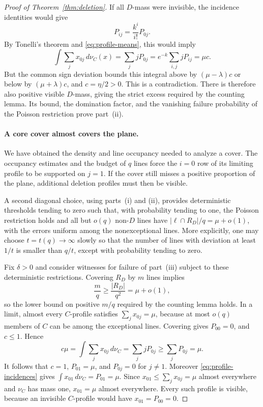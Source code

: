 \begin{proof}[Proof of Theorem~\ref{thm:deletion}]
If all $D$-mass were invisible, the incidence identities would give
\begin{equation}\label{eq:poisson-factorization}
 P_{ij}=\frac{k^i}{i!}P_{0j}.
\end{equation}
By Tonelli's theorem and \eqref{eq:profile-means}, this would imply
\[
 \int\sum_jx_{0j}\,d\nu_C(x)
 =\sum_jjP_{0j}
 =e^{-k}\sum_{i,j}jP_{ij}=\mu c.
\]
But the common sign deviation bounds this integral above by
$(\mu-\lambda)c$ or below by $(\mu+\lambda)c$, and
$c=\eta/2>0$.  This is a contradiction.  There is therefore also positive
visible $D$-mass, giving the strict excess required by the counting
lemma.  Its bound, the domination factor, and the vanishing failure
probability of the Poisson restriction prove part~\textup{(ii)}.

\paragraph{A core cover almost covers the plane.}
We have obtained the density and line occupancy needed to analyze a
cover. The occupancy estimates and the budget of $q$ lines force the
$i=0$ row of its limiting profile to be supported on $j=1$. If the cover
still misses a positive proportion of the plane, additional deletion
profiles must then be visible.

A second diagonal choice, using parts~\textup{(i)} and \textup{(ii)},
provides deterministic thresholds tending to zero such that, with
probability tending to one, the Poisson restriction holds and all but
$o(q)$ non-$D$ lines have $|\ell\cap R_D|/q=\mu+o(1)$, with the errors
uniform among the nonexceptional lines.  More explicitly, one may choose
$t=t(q)\to\infty$ slowly so that the number of lines with deviation at
least $1/t$ is smaller than $q/t$, except with probability tending to zero.

Fix $\delta>0$ and consider witnesses for failure of part~\textup{(iii)}
subject to these deterministic restrictions.  Covering $R_D$ by $m$ lines
implies
\[
 \frac mq\ge\frac{|R_D|}{q^2}=\mu+o(1),
\]
so the lower bound on positive $m/q$ required by the counting lemma holds.
In a limit, almost every $C$-profile satisfies
$\sum_jx_{0j}=\mu$, because at most $o(q)$ members of $C$ can be among the
exceptional lines.  Covering gives $P_{00}=0$, and $c\le1$.  Hence
\[
 c\mu
 =\int\sum_jx_{0j}\,d\nu_C
 =\sum_jjP_{0j}
 \ge\sum_jP_{0j}=\mu.
\]
It follows that $c=1$, $P_{01}=\mu$, and $P_{0j}=0$ for $j\ne1$.
Moreover \eqref{eq:profile-incidences} gives
$\int x_{01}\,d\nu_C=P_{01}=\mu$.  Since $x_{01}\le\sum_jx_{0j}=\mu$
almost everywhere and $\nu_C$ has mass one, $x_{01}=\mu$ almost everywhere.
Every such profile is visible, because an invisible $C$-profile would
have $x_{01}=P_{00}=0$.


\end{proof}
